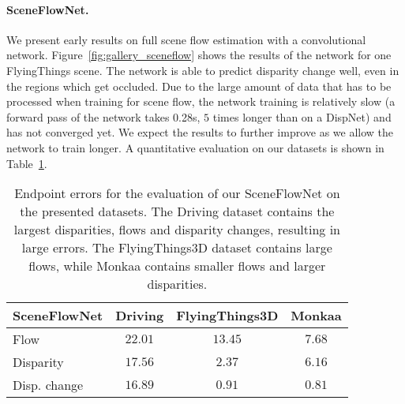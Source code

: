 \documentclass[10pt,twocolumn,letterpaper]{article}
\begin{document}
\paragraph{SceneFlowNet.}
We present early results on full scene flow estimation with a convolutional network.
Figure~\ref{fig:gallery_sceneflow} shows the results of the network for one FlyingThings scene. 
The network is able to predict disparity change  well, even in the regions which get occluded.
Due to the large amount of data that has to be processed when training for scene flow, the network training is relatively slow (a forward pass of the network takes 0.28s, $5$ times longer than on a DispNet) and has not converged yet. 
We expect the results to further improve as we allow the network to train longer.  
A quantitative evaluation on our datasets is shown in Table~\ref{table:sceneflownet_evaluation}. 

\begin{table}
  \begin{center}
    \begin{tabular}{|l||c|c|c|}
      \hline
      SceneFlowNet & Driving & FlyingThings3D & Monkaa \\
      \hline
      \hline
      Flow              & $22.01$  & $13.45$ & $7.68$ \\
      Disparity         & $17.56$  & $2.37$ & $6.16$ \\
      Disp. change  & $16.89$  & $0.91$ & $0.81$ \\
      \hline
      \end{tabular}
  \end{center}
  \caption{Endpoint errors for the evaluation of our SceneFlowNet on the presented datasets. 
  The Driving dataset contains the largest disparities, flows and disparity changes, resulting in large errors. 
  The FlyingThings3D dataset contains large flows, while Monkaa contains smaller flows and larger disparities.}
  \label{table:sceneflownet_evaluation}
\end{table}
\end{document}
